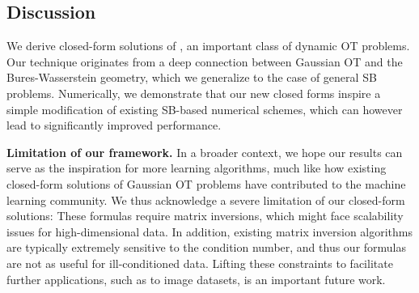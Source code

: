 \subsection{Discussion}
 We derive closed-form solutions of , an important class of dynamic \acrshort{OT} problems. Our technique originates from a deep connection between Gaussian \acrshort{OT} and the Bures-Wasserstein geometry, which we generalize to the case of general \acrshort{SB} problems. Numerically, we demonstrate that our new closed forms inspire a simple modification of existing \acrshort{SB}-based numerical schemes, which can however lead to significantly improved performance.

\textbf{Limitation of our framework. }
 In a broader context, we hope our results can serve as the inspiration for more learning algorithms, much like how existing closed-form solutions of Gaussian \acrshort{OT} problems have contributed to the machine learning community. We thus acknowledge a severe limitation of our closed-form solutions: These formulas require matrix inversions, which might face scalability issues for high-dimensional data. In addition, existing matrix inversion algorithms are typically extremely sensitive to the condition number, and thus our formulas are not as useful for ill-conditioned data. Lifting these constraints to facilitate further applications, such as to image datasets, is an important future work.

